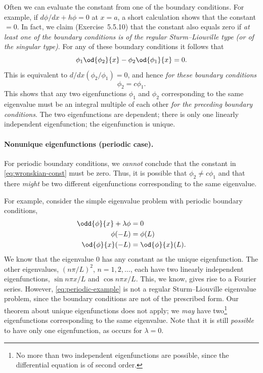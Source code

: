 Often we can evaluate the constant from one of the boundary conditions.  For example, if $d\phi/dx + h\phi = 0$ at $x = a$, a short calculation shows that the constant $= 0$.  In fact, we claim (Exercise~5.5.10) that the constant also equals zero if \textit{at least one of the boundary conditions is of the regular Sturm--Liouville type (or of the singular type)}.  For any of these boundary conditions it follows that
\begin{equation}
\label{eq:unique-1}
\phi_1\od{\phi_2}{x} - \phi_2\od{\phi_1}{x} = 0.
\end{equation}
This is equivalent to $d/dx(\phi_2/\phi_1) = 0$, and hence \textit{for these boundary conditions}
\begin{equation}
\label{eq:unique-2}
\phi_2 = c\phi_1.
\end{equation}
This shows that any two eigenfunctions $\phi_1$ and $\phi_2$ corresponding to the same eigenvalue must be an integral multiple of each other \textit{for the preceding boundary conditions}.  The two eigenfunctions are dependent; there is only one linearly independent eigenfunction; the eigenfunction is unique.

\paragraph{Nonunique eigenfunctions (periodic case).}
For periodic boundary conditions, we \textit{cannot} conclude that the constant in \eqref{eq:wronskian-const} must be zero.  Thus, it is possible that $\phi_2 \neq c\phi_1$ and that there \textit{might} be two different eigenfunctions corresponding to the same eigenvalue.

For example, consider the simple eigenvalue problem with periodic boundary conditions,
\begin{equation}
\label{eq:periodic-example}
\begin{aligned}
\odd{\phi}{x} + \lambda\phi &= 0 \\
\phi(-L) &= \phi(L) \\
\od{\phi}{x}(-L) &= \od{\phi}{x}(L).
\end{aligned}
\end{equation}
We know that the eigenvalue 0 has any constant as the unique eigenfunction.  The other eigenvalues, $(n\pi/L)^2$, $n = 1, 2, \ldots$, each have two linearly independent eigenfunctions, $\sin n\pi x/L$ and $\cos n\pi x/L$.  This, we know, gives rise to a Fourier series.  However, \eqref{eq:periodic-example} is not a regular Sturm--Liouville eigenvalue problem, since the boundary conditions are not of the prescribed form.  Our theorem about unique eigenfunctions does not apply; we \textit{may} have two\footnote{No more than two independent eigenfunctions are possible, since the differential equation is of second order.} eigenfunctions corresponding to the same eigenvalue.  Note that it is still \textit{possible} to have only one eigenfunction, as occurs for $\lambda = 0$.

